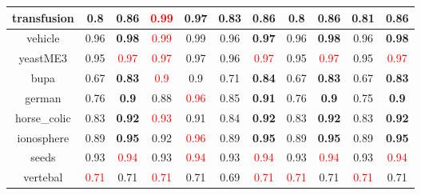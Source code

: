 \documentclass{article}%
\begin{document}
\begin{tabular}{c|cccccccccc}
\hline%
transfusion&0.8&\textbf{0.86}&\textcolor{red}{ 
0.99
}&0.97&0.83&\textbf{0.86}&0.8&\textbf{0.86}&0.81&\textbf{0.86}\\%
\hline%
vehicle&0.96&\textbf{0.98}&\textcolor{red}{ 
0.99
}&0.99&0.96&\textbf{0.97}&0.96&\textbf{0.98}&0.96&\textbf{0.98}\\%
\hline%
yeastME3&0.95&\textcolor{red}{ 
0.97
}&\textcolor{red}{ 
0.97
}&0.97&0.96&\textcolor{red}{ 
0.97
}&0.95&\textcolor{red}{ 
0.97
}&0.95&\textcolor{red}{ 
0.97
}\\%
\hline%
bupa&0.67&\textbf{0.83}&\textcolor{red}{ 
0.9
}&0.9&0.71&\textbf{0.84}&0.67&\textbf{0.83}&0.67&\textbf{0.83}\\%
\hline%
german&0.76&\textbf{0.9}&0.88&\textcolor{red}{ 
0.96
}&0.85&\textbf{0.91}&0.76&\textbf{0.9}&0.75&\textbf{0.9}\\%
\hline%
horse\_colic&0.83&\textbf{0.92}&\textcolor{red}{ 
0.93
}&0.91&0.84&\textbf{0.92}&0.83&\textbf{0.92}&0.83&\textbf{0.92}\\%
\hline%
ionosphere&0.89&\textbf{0.95}&0.92&\textcolor{red}{ 
0.96
}&0.89&\textbf{0.95}&0.89&\textbf{0.95}&0.89&\textbf{0.95}\\%
\hline%
seeds&0.93&\textcolor{red}{ 
0.94
}&0.93&\textcolor{red}{ 
0.94
}&0.93&\textcolor{red}{ 
0.94
}&0.93&\textcolor{red}{ 
0.94
}&0.93&\textcolor{red}{ 
0.94
}\\%
\hline%
vertebal&\textcolor{red}{ 
0.71
}&0.71&\textcolor{red}{ 
0.71
}&0.71&0.69&\textcolor{red}{ 
0.71
}&\textcolor{red}{ 
0.71
}&0.71&\textcolor{red}{ 
0.71
}&0.71\\%
\hline%
\end{tabular}

%
\end{document}
